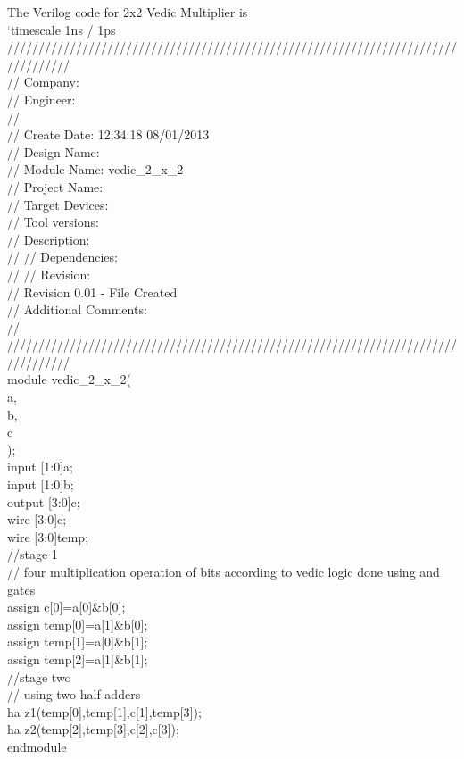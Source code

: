 The Verilog code for 2x2 Vedic Multiplier is \\
`timescale 1ns / 1ps\\
//////////////////////////////////////////////////////////////////////////////////\\
// Company: \\
// Engineer: \\
// \\
// Create Date:    12:34:18 08/01/2013 \\
// Design Name: \\
// Module Name:    vedic\_2\_x\_2 \\
// Project Name: \\
// Target Devices: \\
// Tool versions: \\
// Description: \\
//
// Dependencies: \\
//
// Revision: \\
// Revision 0.01 - File Created \\
// Additional Comments: \\
//\\
//////////////////////////////////////////////////////////////////////////////////\\
module vedic\_2\_x\_2(\\
a,\\
b,\\
c\\
    );\\
input [1:0]a;\\
input [1:0]b;\\
output [3:0]c;\\
wire [3:0]c;\\
wire [3:0]temp;\\
//stage 1\\
// four multiplication operation of bits according to vedic logic done using and gates \\
assign c[0]=a[0]\&b[0]; \\
assign temp[0]=a[1]\&b[0];\\
assign temp[1]=a[0]\&b[1];\\
assign temp[2]=a[1]\&b[1];\\
//stage two \\
// using two half adders \\
ha z1(temp[0],temp[1],c[1],temp[3]);\\
ha z2(temp[2],temp[3],c[2],c[3]);\\
endmodule\\
